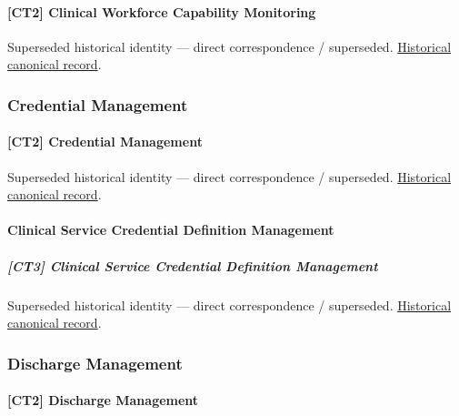 \paragraph{[CT2] Clinical Workforce Capability Monitoring}

\par\label{element:24c015676c254e2e82e8e4287c295179}
Superseded historical identity — direct correspondence / superseded. \href{../../../../continuum/strategy/capability/24c015676c254e2e82e8e4287c295179.md}{Historical canonical record}.\par

\subsubsection{Credential Management}

\paragraph{[CT2] Credential Management}

\par\label{element:bab3d0ab6eb748978b962ea20fb31640}
Superseded historical identity — direct correspondence / superseded. \href{../../../../continuum/strategy/capability/bab3d0ab6eb748978b962ea20fb31640.md}{Historical canonical record}.\par

\paragraph{Clinical Service Credential Definition Management}

\subparagraph{[CT3] Clinical Service Credential Definition Management}

\par\label{element:0115ed50867d468a95c0fafa1c5d79e2}
Superseded historical identity — direct correspondence / superseded. \href{../../../../continuum/strategy/capability/0115ed50867d468a95c0fafa1c5d79e2.md}{Historical canonical record}.\par

\subsubsection{Discharge Management}

\paragraph{[CT2] Discharge Management}

